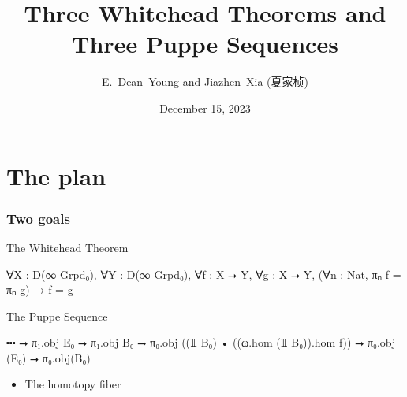 \documentclass{beamer}
\title{Three Whitehead Theorems and Three Puppe Sequences}
\author{E.~Dean~Young and Jiazhen~Xia (夏家桢)}
\date{December 15, 2023}
\begin{document}
\begin{frame}
\titlepage
\end{frame}


\section{The plan}

\begin{frame}[fragile]
\frametitle{Two goals}
\begin{block}{The Whitehead Theorem}
\begin{leancode}
          ∀X : D(∞-Grpd₀), ∀Y : D(∞-Grpd₀),
          ∀f : X ⭢ Y, ∀g : X ⭢ Y,
          (∀n : Nat, πₙ f = πₙ g) → f = g
\end{leancode}
\end{block}

\medskip

\begin{block}{The Puppe Sequence}
\begin{leancode}
          ⬝⬝⬝ ⭢ π₁.obj E₀ ⭢ π₁.obj B₀ ⭢
          π₀.obj ((𝟙 B₀) • ((ω.hom (𝟙 B₀)).hom f)) ⭢
          π₀.obj (E₀) ⭢ π₀.obj(B₀)
\end{leancode}
\end{block}

\medskip
\begin{itemize}
	\item The homotopy fiber
\end{itemize}

\end{frame}

\end{document}
